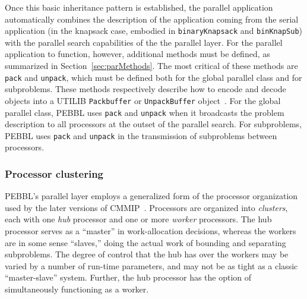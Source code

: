 Once this basic inheritance pattern is established, the parallel
application automatically combines the description of the application
coming from the serial application (in the knapsack case, embodied in
\texttt{binaryKnapsack} and \texttt{binKnapSub}) with the parallel
search capabilities of the the parallel layer.  For the parallel
application to function, however, additional methods must be defined,
as summarized in Section~\ref{sec:parMethods}.  The most critical of
these methods are \texttt{pack} and \texttt{unpack}, which must be
defined both for the global parallel class and for subproblems.  These
methods respectively describe how to encode and decode objects into a
UTILIB \texttt{Packbuffer} or \texttt{UnpackBuffer} object~\cite{UTILIB}.  For the
global parallel class, PEBBL uses \texttt{pack} and \texttt{unpack}
when it broadcasts the problem description to all processors at the
outset of the parallel search.  For subproblems, PEBBL uses
\texttt{pack} and \texttt{unpack} in the transmission of subproblems
between processors.

\subsubsection{Processor clustering}
\label{sec:clustering}
PEBBL's parallel layer employs a generalized form of the processor
organization used by the later versions of CMMIP~\cite{Eck94,Eck97}.
Processors are organized into \emph{clusters}, each with one
\emph{hub} processor and one or more \emph{worker} processors.  The
hub processor serves as a ``master'' in work-allocation decisions,
whereas the workers are in some sense ``slaves,'' doing the actual
work of bounding and separating subproblems. The degree of control
that the hub has over the workers may be varied by a number of
run-time parameters, and may not be as tight as a classic
``master-slave'' system.  Further, the hub processor has the option of
simultaneously functioning as a worker.

